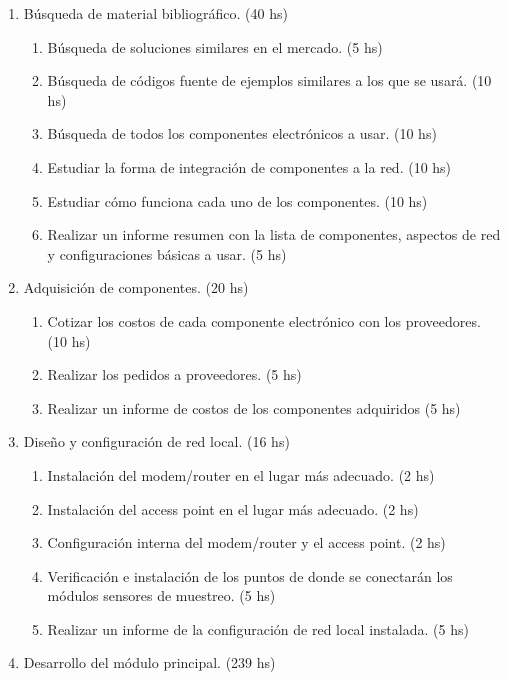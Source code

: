 \documentclass[11pt]{charter}
\begin{document}
\begin{enumerate}
\item Búsqueda de material bibliográfico. (40 hs)
	\begin{enumerate}
	\item Búsqueda de soluciones similares en el mercado. (5 hs)
	\item Búsqueda de códigos fuente de ejemplos similares a los que se usará. (10 hs)
	\item Búsqueda de todos los componentes electrónicos a usar. (10 hs)
	\item Estudiar la forma de integración de componentes a la red. (10 hs)
	\item Estudiar cómo funciona cada uno de los componentes. (10 hs)
	\item Realizar un informe resumen con la lista de componentes, aspectos de red y configuraciones básicas a usar. (5 hs)
	\end{enumerate}
\item Adquisición de componentes. (20 hs)
	\begin{enumerate}
	\item Cotizar los costos de cada componente electrónico con los proveedores. (10 hs)
	\item Realizar los pedidos a proveedores. (5 hs)
	\item Realizar un informe de costos de los componentes adquiridos (5 hs)
	\end{enumerate}
\item Diseño y configuración de red local. (16 hs)
	\begin{enumerate}
	\item Instalación del modem/router en el lugar más adecuado. (2 hs)
	\item Instalación del access point en el lugar más adecuado. (2 hs)
	\item Configuración interna del modem/router y el access point. (2 hs)
	\item Verificación e instalación de los puntos de donde se conectarán los módulos sensores de muestreo. (5 hs)
	\item Realizar un informe de la configuración de red local instalada. (5 hs)
	\end{enumerate}
\item Desarrollo del módulo principal. (239 hs)
	\begin{enumerate}

\end{enumerate}
\end{enumerate}
\end{document}
